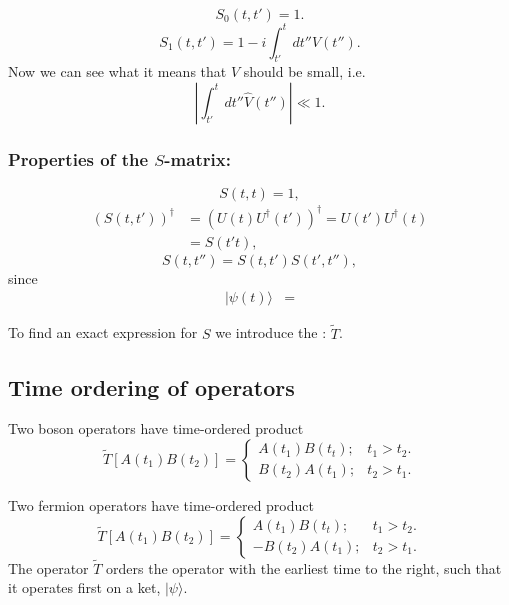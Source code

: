 \[S_{0}(t,t')=1.\]
\[S_{1}(t,t')=1-i\int_{t'}^{t}dt''\hat{V}(t'').\]
Now we can see what it means that $V$ should be small, i.e. \[\left|\int_{t'}^{t}dt''\hat{V}(t'')\right|\ll1.\]
\begin{Indentskip}
	\subsubsection*{Properties of the $S$-matrix:}
	\[S(t,t)=1,\]
	\begin{align}
		\left(S(t,t')\right)^{\dagger}&=\left(U(t)U^{\dagger}(t')\right)^{\dagger} = U(t')U^{\dagger}(t)\nonumber \\
	&=S(t't),\nonumber
	\end{align}
	\[S(t,t'')=S(t,t')S(t',t''),\] since
	\begin{align}
		|\psi(t)\rangle&=    \nonumber
	\end{align}
\end{Indentskip}
To find an exact expression for $S$ we introduce the : $\tilde{T}$.
\subsection*{Time ordering of operators}
Two boson operators have time-ordered product 
\[\tilde{T}[A(t_{1})B(t_{2})]= \begin{cases}A(t_{1})B(t_{t}); & t_{1}>t_{2}.\\
B(t_{2})A(t_{1}); & t_{2}>t_{1}.
\end{cases} \]

Two fermion operators have time-ordered product
\[\tilde{T}[A(t_{1})B(t_{2})]= \begin{cases}A(t_{1})B(t_{t}); & t_{1}>t_{2}.\\
-B(t_{2})A(t_{1}); & t_{2}>t_{1}.
\end{cases} \] 
The operator $\tilde{T}$ orders the operator with the earliest time to the right, such that it operates first on a ket, $|\psi\rangle$.

